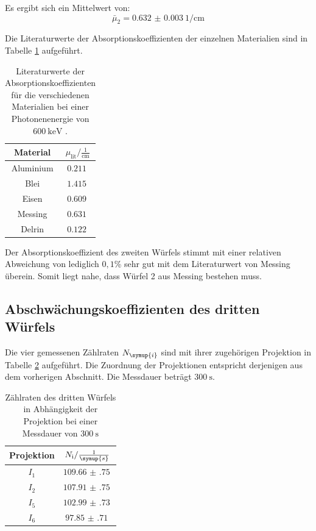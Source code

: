 Es ergibt sich ein Mittelwert von:
\begin{equation*}
  \bar\mu_2 = \SI{0.632(3)}{1\per\centi\meter}
\end{equation*}

Die Literaturwerte der Absorptionskoeffizienten der einzelnen Materialien
sind in Tabelle \ref{tab:literatur} aufgeführt.

\begin{table}[H]
  \centering
  \caption{Literaturwerte der Absorptionskoeffizienten für die verschiedenen Materialien bei einer
  Photonenenergie von $\SI{600}{\kilo\eV}$ \cite{sample2}.}
  \label{tab:literatur}
  \begin{tabular}{c c}
    \toprule
    Material &  $\mu_{\mathrm{lit}} / \frac{1}{\mathrm{cm}}$  \\
    \midrule
        Aluminium    & $\SI{0.211}{}$ \\
        Blei    & $\SI{1.415}{}$ \\
        Eisen & $\SI{0.609}{}$ \\
        Messing    & $\SI{0.631}{}$ \\
        Delrin & $\SI{0.122}{}$ \\
    \bottomrule
  \end{tabular}
\end{table}

Der Absorptionskoeffizient des zweiten Würfels stimmt mit einer relativen Abweichung
von lediglich $0,1$\% sehr gut mit dem Literaturwert von Messing überein.
Somit liegt nahe, dass Würfel 2 aus Messing bestehen muss.

\subsection{Abschwächungskoeffizienten des dritten Würfels}

Die vier gemessenen Zählraten $N_\symup{i}$ sind mit ihrer zugehörigen Projektion in Tabelle
\ref{tab:w3} aufgeführt. Die Zuordnung der Projektionen entspricht derjenigen aus dem
vorherigen Abschnitt. Die Messdauer beträgt $\SI{300}{\second}$.

\begin{table}[H]
  \centering
  \caption{Zählraten des dritten Würfels in Abhängigkeit der Projektion bei einer Messdauer von $\SI{300}{\second}$ }
  \label{tab:w3}
  \begin{tabular}{c c}
    \toprule
    Projektion & $N_{\mathrm{i}} / \frac{1}{\symup{s}}$   \\
    \midrule
        $I_1$    & $\SI{109.66(75)}{}$ \\
        $I_2$    & $\SI{107.91(75)}{}$ \\
        $I_5$    & $\SI{102.99(73)}{}$ \\
        $I_6$    & $\SI{97.85(71)}{}$ \\
    \bottomrule
  \end{tabular}
\end{table}

